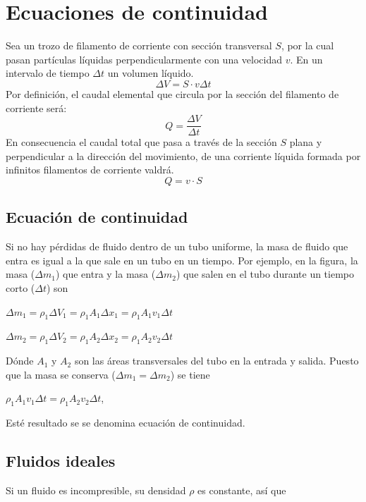 \documentclass[../main]{subfiles}
\begin{document}
\chapter{Ecuaciones de continuidad}
Sea un trozo de filamento de corriente con sección transversal $S$,
por la cual pasan partículas líquidas perpendicularmente con una
velocidad $v$. En un intervalo de tiempo $\Delta t$ un volumen líquido.
\begin{equation}
  \Delta V = S \cdot v \Delta t
\end{equation}
Por definición, el caudal elemental que circula por la sección del
filamento de corriente será:
\begin{equation}
  Q= \dfrac{\Delta V}{\Delta t}
\end{equation}
En consecuencia el caudal total que pasa a través de la sección $S$
plana y perpendicular a la dirección del movimiento, de una
corriente líquida formada por infinitos filamentos de corriente valdrá.
\begin{equation}
  Q= v \cdot S
\end{equation}
\section{Ecuación de continuidad}
Si no hay pérdidas de fluido dentro de un tubo
uniforme, la masa de fluido que entra es igual a
la que sale en un tubo en un tiempo. Por
ejemplo, en la figura, la masa ($\Delta m_1$) que entra y la masa
($\Delta m_2$) que salen en el tubo durante
un tiempo corto ($\Delta t$) son

$\Delta m_1 = \rho_1 \Delta V_1 = \rho_1A_1\Delta x_1 = \rho_1 A_1
v_1 \Delta t$

$\Delta m_2 = \rho_1 \Delta V_2 = \rho_1 A_2 \Delta x_2 = \rho_1
A_2 v_2 \Delta t$

Dónde $A_1$ y $A_2$ son las áreas transversales del tubo en la
entrada y salida. Puesto que la masa se conserva ($\Delta m_1 =
\Delta m_2$) se tiene

$\rho_1 A_1 v_1\Delta t = \rho_1 A_2 v_2\Delta t$,

Esté resultado se se denomina ecuación de continuidad.
\section{Fluidos ideales}
Si un fluido es incompresible, su densidad $\rho$ es
constante, así que
\end{document}
